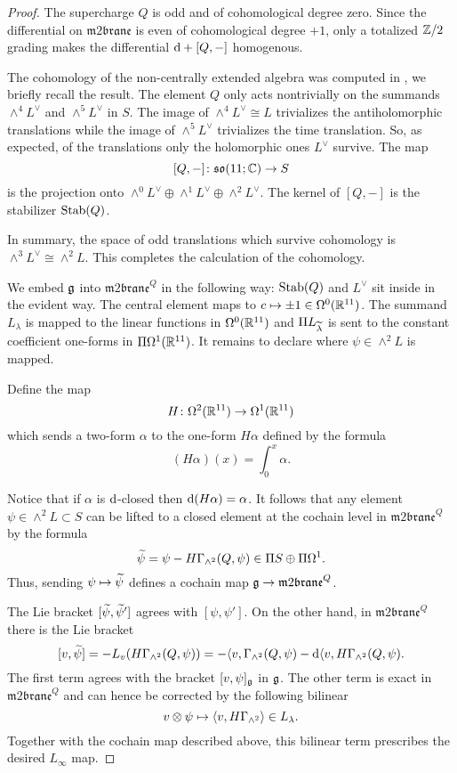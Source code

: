 \documentclass[11pt]{amsart}
\def\m2{\mathfrak{m}2\mathfrak{brane}}
\def\lie#1{\ensuremath{\mathfrak{#1}}}
\begin{document}
\begin{proof}
The supercharge $Q$ is odd and of cohomological degree zero.
Since the differential on $\m2$ is even of cohomological degree $+1$, only a totalized $\ZZ/2$ grading makes the differential $\d + [Q,-]$ homogenous. 

The cohomology of the non-centrally extended algebra was computed in \cite{SWpure}, we briefly recall the result. 
The element $Q$ only acts nontrivially on the summands $\wedge^4 L^\vee$ and $\wedge^5 L^\vee$ in $S$. 
The image of $\wedge^4 L^\vee \cong L$ trivializes the antiholomorphic translations while the image of $\wedge^5 L^\vee$ trivializes the time translation.
So, as expected, of the translations only the holomorphic ones $L^\vee$ survive.
The map 
\[
[Q,-] \colon \lie{so}(11;\CC) \to S 
\] 
is the projection onto $\wedge^0 L^\vee \oplus \wedge^1 L^\vee \oplus \wedge^2 L^\vee$. 
The kernel of $[Q,-]$ is the stabilizer ${\rm Stab}(Q)$.

In summary, the space of odd translations which survive cohomology is $\wedge^3 L^\vee \cong \wedge^2 L$.
This completes the calculation of the cohomology. 

We embed $\fg$ into $\m2^Q$ in the following way: ${\rm Stab}(Q)$ and $L^\vee$ sit inside in the evident way.
The central element maps to $c \mapsto \pm 1 \in \Omega^0(\RR^{11})$.
The summand $L_\lambda$ is mapped to the linear functions in $\Omega^0(\RR^{11})$ and $\Pi L_{\Tilde{\lambda}}$ is sent to the constant coefficient one-forms in $\Pi \Omega^1(\RR^{11})$. 
It remains to declare where $\psi \in \wedge^2 L$ is mapped.

Define the map
\[
H \colon \Omega^2 (\RR^{11}) \to \Omega^1(\RR^{11})
\]
which sends a two-form $\alpha$ to the one-form $H \alpha$ defined by the formula
\[
(H \alpha) (x) = \int_0^x \alpha .
\]

Notice that if $\alpha$ is $\d$-closed then $\d (H \alpha) = \alpha$. 
It follows that any element $\psi \in \wedge^2 L \subset S$ can be lifted to a closed element at the cochain level in $\m2^Q$ by the formula
\[
\Tilde{\psi} = \psi - H \Gamma_{\wedge^2} (Q, \psi) \in \Pi S \oplus \Pi \Omega^1 .
\]
Thus, sending $\psi \mapsto \Tilde{\psi}$ defines a cochain map $\fg \to \m2^Q$. 

The Lie bracket $[\Tilde{\psi}, \Tilde{\psi}']$ agrees with $[\psi, \psi']$. 
On the other hand, in $\m2^Q$ there is the Lie bracket 
\[
[v,\Tilde{\psi}] = - L_v (H \Gamma_{\wedge^2} (Q, \psi)) = -\<v, \Gamma_{\wedge^2}(Q, \psi) - \d \<v, H \Gamma_{\wedge^2}(Q, \psi) .
\]
The first term agrees with the bracket $[v, \psi]_{\fg}$ in $\fg$. 
The other term is exact in $\m2^Q$ and can hence be corrected by the following bilinear  
\[
v \otimes \psi \mapsto \<v, H \Gamma_{\wedge^2} \> \in L_\lambda .
\] 
Together with the cochain map described above, this bilinear term prescribes the desired $L_\infty$ map. 

\end{proof}
\end{document}
